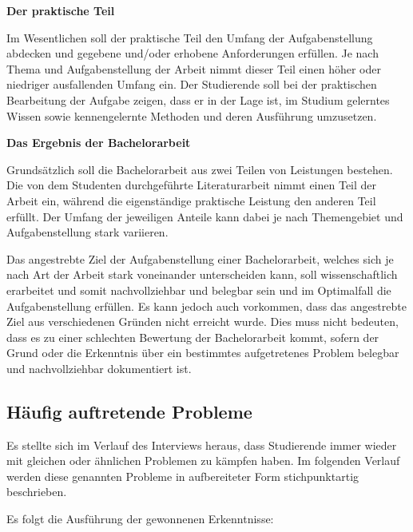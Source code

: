 \documentclass[bibliography=totoc,listof=totoc,BCOR=5mm,DIV=12,oneside]{scrbook}
\begin{document}
\newpage
\par \bigskip \textbf{Der praktische Teil}
\par Im Wesentlichen soll der praktische Teil den Umfang der Aufgabenstellung abdecken und gegebene und/oder erhobene Anforderungen erfüllen. Je nach Thema und Aufgabenstellung der Arbeit nimmt dieser Teil einen höher oder niedriger ausfallenden Umfang ein.
Der Studierende soll bei der praktischen Bearbeitung der Aufgabe zeigen, dass er in der Lage ist, im Studium gelerntes Wissen sowie kennengelernte Methoden und deren Ausführung umzusetzen. 
\par \bigskip \textbf{Das Ergebnis der Bachelorarbeit}
\par Grundsätzlich soll die Bachelorarbeit aus zwei Teilen von Leistungen bestehen. Die von dem Studenten durchgeführte Literaturarbeit nimmt einen Teil der Arbeit ein, während die eigenständige praktische Leistung den anderen Teil erfüllt. Der Umfang der jeweiligen Anteile kann dabei je nach Themengebiet und Aufgabenstellung stark variieren.
\par Das angestrebte Ziel der Aufgabenstellung einer Bachelorarbeit, welches sich je nach Art der Arbeit stark voneinander unterscheiden kann, soll wissenschaftlich erarbeitet und somit nachvollziehbar und belegbar sein und im Optimalfall die Aufgabenstellung erfüllen. Es kann jedoch auch vorkommen, dass das angestrebte Ziel aus verschiedenen Gründen nicht erreicht wurde. Dies muss nicht bedeuten, dass es zu einer schlechten Bewertung der Bachelorarbeit kommt, sofern der Grund oder die Erkenntnis über ein bestimmtes aufgetretenes Problem belegbar und nachvollziehbar dokumentiert ist.

\newpage
\subsection{Häufig auftretende Probleme}
\par Es stellte sich im Verlauf des Interviews heraus, dass Studierende immer wieder mit gleichen oder ähnlichen Problemen zu kämpfen haben. Im folgenden Verlauf werden diese genannten Probleme in aufbereiteter Form stichpunktartig beschrieben.

\par \medskip Es folgt die Ausführung der gewonnenen Erkenntnisse:
\end{document}
